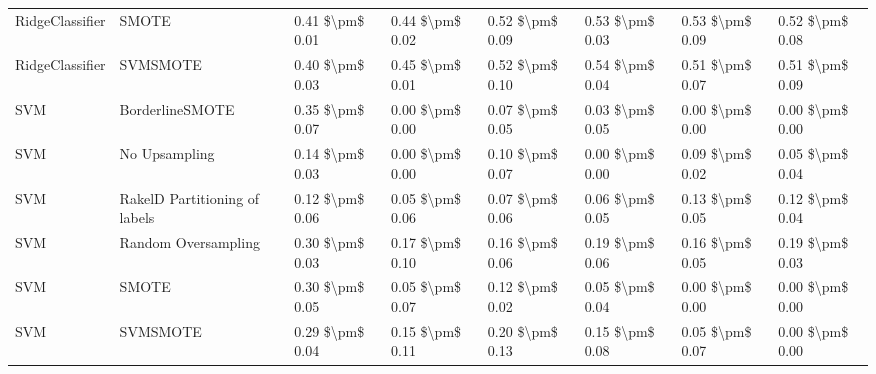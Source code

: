 \begin{tabular}{llllllll}
                RidgeClassifier &                         SMOTE & 0.41 \$\textbackslash pm\$ 0.01 &           0.44 \$\textbackslash pm\$ 0.02 &       0.52 \$\textbackslash pm\$ 0.09 &        0.53 \$\textbackslash pm\$ 0.03 &                         0.53 \$\textbackslash pm\$ 0.09 &     0.52 \$\textbackslash pm\$ 0.08 \\
                RidgeClassifier &                      SVMSMOTE & 0.40 \$\textbackslash pm\$ 0.03 &           0.45 \$\textbackslash pm\$ 0.01 &       0.52 \$\textbackslash pm\$ 0.10 &        0.54 \$\textbackslash pm\$ 0.04 &                         0.51 \$\textbackslash pm\$ 0.07 &     0.51 \$\textbackslash pm\$ 0.09 \\
                            SVM &               BorderlineSMOTE & 0.35 \$\textbackslash pm\$ 0.07 &           0.00 \$\textbackslash pm\$ 0.00 &       0.07 \$\textbackslash pm\$ 0.05 &        0.03 \$\textbackslash pm\$ 0.05 &                         0.00 \$\textbackslash pm\$ 0.00 &     0.00 \$\textbackslash pm\$ 0.00 \\
                            SVM &                 No Upsampling & 0.14 \$\textbackslash pm\$ 0.03 &           0.00 \$\textbackslash pm\$ 0.00 &       0.10 \$\textbackslash pm\$ 0.07 &        0.00 \$\textbackslash pm\$ 0.00 &                         0.09 \$\textbackslash pm\$ 0.02 &     0.05 \$\textbackslash pm\$ 0.04 \\
                            SVM & RakelD Partitioning of labels & 0.12 \$\textbackslash pm\$ 0.06 &           0.05 \$\textbackslash pm\$ 0.06 &       0.07 \$\textbackslash pm\$ 0.06 &        0.06 \$\textbackslash pm\$ 0.05 &                         0.13 \$\textbackslash pm\$ 0.05 &     0.12 \$\textbackslash pm\$ 0.04 \\
                            SVM &           Random Oversampling & 0.30 \$\textbackslash pm\$ 0.03 &           0.17 \$\textbackslash pm\$ 0.10 &       0.16 \$\textbackslash pm\$ 0.06 &        0.19 \$\textbackslash pm\$ 0.06 &                         0.16 \$\textbackslash pm\$ 0.05 &     0.19 \$\textbackslash pm\$ 0.03 \\
                            SVM &                         SMOTE & 0.30 \$\textbackslash pm\$ 0.05 &           0.05 \$\textbackslash pm\$ 0.07 &       0.12 \$\textbackslash pm\$ 0.02 &        0.05 \$\textbackslash pm\$ 0.04 &                         0.00 \$\textbackslash pm\$ 0.00 &     0.00 \$\textbackslash pm\$ 0.00 \\
                            SVM &                      SVMSMOTE & 0.29 \$\textbackslash pm\$ 0.04 &           0.15 \$\textbackslash pm\$ 0.11 &       0.20 \$\textbackslash pm\$ 0.13 &        0.15 \$\textbackslash pm\$ 0.08 &                         0.05 \$\textbackslash pm\$ 0.07 &     0.00 \$\textbackslash pm\$ 0.00 \\

\end{tabular}

